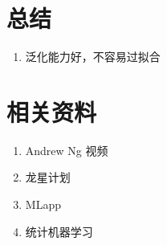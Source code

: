 \section{总结}
\begin{enumerate}
\item 泛化能力好，不容易过拟合
\cite{longxing2012machinelearning}
\end{enumerate}
\section{相关资料}
\begin{enumerate}
\item Andrew Ng 视频
\item 龙星计划
\item MLapp
\item 统计机器学习
\end{enumerate}
